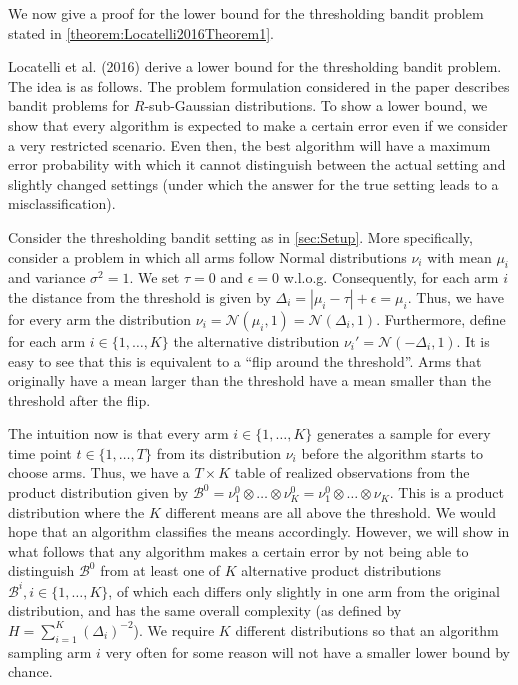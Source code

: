 \documentclass[11pt,]{article}
\begin{document}
We now give a proof for the lower bound for the thresholding bandit
problem stated in \autoref{theorem:Locatelli2016Theorem1}.

Locatelli et al. (2016) derive a lower bound for the thresholding bandit
problem. The idea is as follows. The problem formulation considered in
the paper describes bandit problems for \(R\)-sub-Gaussian
distributions. To show a lower bound, we show that every algorithm is
expected to make a certain error even if we consider a very restricted
scenario. Even then, the best algorithm will have a maximum error
probability with which it cannot distinguish between the actual setting
and slightly changed settings (under which the answer for the true
setting leads to a misclassification).

Consider the thresholding bandit setting as in \autoref{sec:Setup}. More
specifically, consider a problem in which all arms follow Normal
distributions \(\nu_i\) with mean \(\mu_i\) and variance
\(\sigma^2 = 1\). We set \(\tau = 0\) and \(\epsilon = 0\) w.l.o.g.
Consequently, for each arm \(i\) the distance from the threshold is
given by \(\Delta_i = |\mu_i - \tau| + \epsilon = \mu_i\). Thus, we have
for every arm the distribution
\(\nu_i = \mathcal{N}(\mu_i,1) = \mathcal{N}(\Delta_i,1)\). Furthermore,
define for each arm \(i \in \{1, \dots, K\}\) the alternative
distribution \(\nu_i' = \mathcal{N}(-\Delta_i,1)\). It is easy to see
that this is equivalent to a ``flip around the threshold''. Arms that
originally have a mean larger than the threshold have a mean smaller
than the threshold after the flip.

The intuition now is that every arm \(i \in \{1,\dots,K\}\) generates a
sample for every time point \(t\in \{1, \dots, T\}\) from its
distribution \(\nu_i\) before the algorithm starts to choose arms. Thus,
we have a \(T \times K\) table of realized observations from the product
distribution given by
\(\mathcal{B}^0 = \nu_1^0 \otimes \ldots \otimes \nu_K^0 = \nu_1^0 \otimes \ldots \otimes \nu_K\).
This is a product distribution where the \(K\) different means are all
above the threshold. We would hope that an algorithm classifies the
means accordingly. However, we will show in what follows that any
algorithm makes a certain error by not being able to distinguish
\(\mathcal{B}^0\) from at least one of \(K\) alternative product
distributions \(\mathcal{B}^i, i \in \{1, \dots, K\}\), of which each
differs only slightly in one arm from the original distribution, and has
the same overall complexity (as defined by
\(H = \sum_{i=1}^K (\Delta_i)^{-2}\)). We require \(K\) different
distributions so that an algorithm sampling arm \(i\) very often for
some reason will not have a smaller lower bound by chance.
\end{document}
